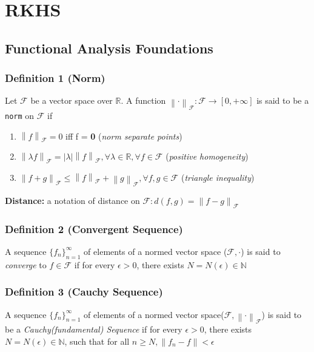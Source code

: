 \section{RKHS}

\subsection{Functional Analysis Foundations}

\subsubsection{Definition 1 (Norm)}

Let $\mathcal{F}$  be a vector space over $\mathbb{R}$. A function $\left\| \cdot \right\|_{\mathcal{F}}:\mathcal{F} \rightarrow [0, +\infty ]$  is said to be a \texttt{norm} on $\mathcal{F}$ if

\begin{enumerate}
    \item $\left\| f \right\|_{\mathcal{F}} = 0$ iff f = \textbf{0} (\textit{norm separate points})
    \item $\left\| \lambda f \right\|_{\mathcal{F}} = | \lambda | \left\| f \right\|_{\mathcal{F}}, \forall \lambda \in \mathbb{R}, \forall f \in \mathcal{F} $ (\textit{positive homogeneity})
    \item $\left\| f + g \right\|_{\mathcal{F}} \leq \left\| f \right\|_{\mathcal{F}} + \left\| g \right\|_{\mathcal{F}}, \forall f, g \in \mathcal{F}$ (\textit{triangle inequality})
\end{enumerate}
\textbf{Distance:} a notation of distance on $\mathcal{F}: d(f,g) =  \left\|f-g\right\|_\mathcal{F}$ 

\subsubsection{Definition 2 (Convergent Sequence)}
A sequence $\{f_n\}_{n=1}^{\infty}$ of elements of a normed vector space ($\mathcal{F}, \cdot$) is said to \textit{converge} to $f \in \mathcal{F}$ if for every $\epsilon>0$, there exists $N = N(\epsilon) \in \mathbb{N}$

\subsubsection{Definition 3 (Cauchy Sequence)}
A sequence $\{f_n\}_{n=1}^\infty$ of elements of a normed vector space($\mathcal{F}, \left\| \cdot \right\|_\mathcal{F}$) is said to be a \textit{Cauchy(fundamental) Sequence} if for every $\epsilon > 0$, there exists $N = N(\epsilon) \in \mathbb{N}$, such that for all $n \geq N, \left\| f_n - f \right\| < \epsilon$

